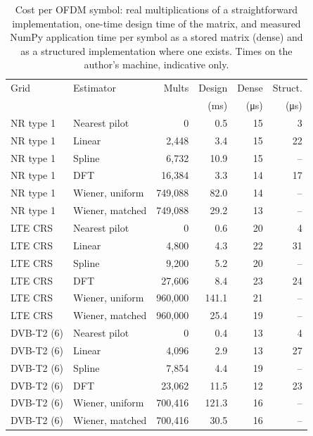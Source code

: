 \begin{table}[t]
\centering
\caption{Cost per OFDM symbol: real multiplications of a straightforward implementation, one-time design time of the matrix, and measured NumPy application time per symbol as a stored matrix (dense) and as a structured implementation where one exists. Times on the author's machine, indicative only.}
\label{tab:cost}
\footnotesize
\setlength{\tabcolsep}{2.5pt}
\begin{tabular}{llrrrr}
\toprule
Grid & Estimator & Mults & Design & Dense & Struct. \\
 & & & (ms) & (\si{\micro\second}) & (\si{\micro\second}) \\
\midrule
NR type 1 & Nearest pilot & 0 & 0.5 & 15 & 3 \\
NR type 1 & Linear & 2,448 & 3.4 & 15 & 22 \\
NR type 1 & Spline & 6,732 & 10.9 & 15 & -- \\
NR type 1 & DFT & 16,384 & 3.3 & 14 & 17 \\
NR type 1 & Wiener, uniform & 749,088 & 82.0 & 14 & -- \\
NR type 1 & Wiener, matched & 749,088 & 29.2 & 13 & -- \\
LTE CRS & Nearest pilot & 0 & 0.6 & 20 & 4 \\
LTE CRS & Linear & 4,800 & 4.3 & 22 & 31 \\
LTE CRS & Spline & 9,200 & 5.2 & 20 & -- \\
LTE CRS & DFT & 27,606 & 8.4 & 23 & 24 \\
LTE CRS & Wiener, uniform & 960,000 & 141.1 & 21 & -- \\
LTE CRS & Wiener, matched & 960,000 & 25.4 & 19 & -- \\
DVB-T2 (6) & Nearest pilot & 0 & 0.4 & 13 & 4 \\
DVB-T2 (6) & Linear & 4,096 & 2.9 & 13 & 27 \\
DVB-T2 (6) & Spline & 7,854 & 4.4 & 19 & -- \\
DVB-T2 (6) & DFT & 23,062 & 11.5 & 12 & 23 \\
DVB-T2 (6) & Wiener, uniform & 700,416 & 121.3 & 16 & -- \\
DVB-T2 (6) & Wiener, matched & 700,416 & 30.5 & 16 & -- \\
\bottomrule
\end{tabular}
\end{table}

